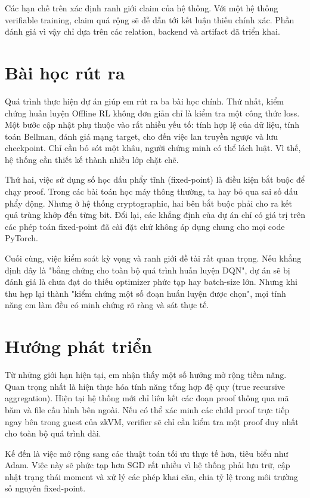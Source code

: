 \documentclass[12pt,a4paper,oneside]{report}
\begin{document}
Các hạn chế trên xác định ranh giới claim của hệ thống. Với một hệ thống verifiable training, claim quá rộng sẽ dễ dẫn tới kết luận thiếu chính xác. Phần đánh giá vì vậy chỉ dựa trên các relation, backend và artifact đã triển khai.

\section{Bài học rút ra}

Quá trình thực hiện dự án giúp em rút ra ba bài học chính. Thứ nhất, kiểm chứng huấn luyện Offline RL không đơn giản chỉ là kiểm tra một công thức loss. Một bước cập nhật phụ thuộc vào rất nhiều yếu tố: tính hợp lệ của dữ liệu, tính toán Bellman, đánh giá mạng target, cho đến việc lan truyền ngược và lưu checkpoint. Chỉ cần bỏ sót một khâu, người chứng minh có thể lách luật. Vì thế, hệ thống cần thiết kế thành nhiều lớp chặt chẽ.

Thứ hai, việc sử dụng số học dấu phẩy tĩnh (fixed-point) là điều kiện bắt buộc để chạy proof. Trong các bài toán học máy thông thường, ta hay bỏ qua sai số dấu phẩy động. Nhưng ở hệ thống cryptographic, hai bên bắt buộc phải cho ra kết quả trùng khớp đến từng bit. Đổi lại, các khẳng định của dự án chỉ có giá trị trên các phép toán fixed-point đã cài đặt chứ không áp dụng chung cho mọi code PyTorch.

Cuối cùng, việc kiểm soát kỳ vọng và ranh giới đề tài rất quan trọng. Nếu khẳng định đây là "bằng chứng cho toàn bộ quá trình huấn luyện DQN", dự án sẽ bị đánh giá là chưa đạt do thiếu optimizer phức tạp hay batch-size lớn. Nhưng khi thu hẹp lại thành "kiểm chứng một số đoạn huấn luyện được chọn", mọi tính năng em làm đều có minh chứng rõ ràng và sát thực tế.

\section{Hướng phát triển}

Từ những giới hạn hiện tại, em nhận thấy một số hướng mở rộng tiềm năng. Quan trọng nhất là hiện thực hóa tính năng tổng hợp đệ quy (true recursive aggregation). Hiện tại hệ thống mới chỉ liên kết các đoạn proof thông qua mã băm và file cấu hình bên ngoài. Nếu có thể xác minh các child proof trực tiếp ngay bên trong guest của zkVM, verifier sẽ chỉ cần kiểm tra một proof duy nhất cho toàn bộ quá trình dài.

Kế đến là việc mở rộng sang các thuật toán tối ưu thực tế hơn, tiêu biểu như Adam. Việc này sẽ phức tạp hơn SGD rất nhiều vì hệ thống phải lưu trữ, cập nhật trạng thái moment và xử lý các phép khai căn, chia tỷ lệ trong môi trường số nguyên fixed-point.
\end{document}
